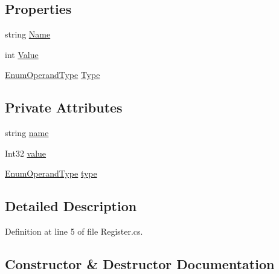 \subsection*{Properties}
\begin{DoxyCompactItemize}
\item 
string \hyperlink{class_c_p_u___o_s___simulator_1_1_c_p_u_1_1_register_a75621754d2c4c740c52b6c21a8151dc4}{Name}
\item 
int \hyperlink{class_c_p_u___o_s___simulator_1_1_c_p_u_1_1_register_a1cabe4ad65d4dc6267be9f34d682e181}{Value}
\item 
\hyperlink{namespace_c_p_u___o_s___simulator_1_1_c_p_u_ad49cfe442b74115a326c03b7ae848f76}{Enum\+Operand\+Type} \hyperlink{class_c_p_u___o_s___simulator_1_1_c_p_u_1_1_register_ac9df7ddedb74ab974a57a334b42e0381}{Type}
\end{DoxyCompactItemize}
\subsection*{Private Attributes}
\begin{DoxyCompactItemize}
\item 
string \hyperlink{class_c_p_u___o_s___simulator_1_1_c_p_u_1_1_register_a1d9405f19dc212f0ff3d3307469451db}{name}
\item 
Int32 \hyperlink{class_c_p_u___o_s___simulator_1_1_c_p_u_1_1_register_a2b4f4fe257f216718313f4e1187b72e9}{value}
\item 
\hyperlink{namespace_c_p_u___o_s___simulator_1_1_c_p_u_ad49cfe442b74115a326c03b7ae848f76}{Enum\+Operand\+Type} \hyperlink{class_c_p_u___o_s___simulator_1_1_c_p_u_1_1_register_acb2f0f96db7cdee5c175562a5f050d83}{type}
\end{DoxyCompactItemize}


\subsection{Detailed Description}


Definition at line 5 of file Register.\+cs.



\subsection{Constructor \& Destructor Documentation}
\hypertarget{class_c_p_u___o_s___simulator_1_1_c_p_u_1_1_register_a1ee1fb682bf9349209b31a50aff2de45}{}
